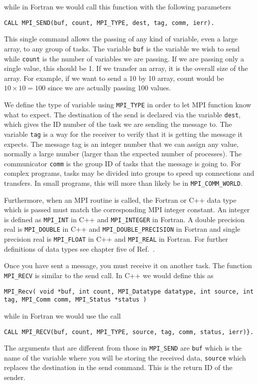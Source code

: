 while in Fortran we would call this function with the following parameters
\begin{lstlisting}
CALL MPI_SEND(buf, count, MPI_TYPE, dest, tag, comm, ierr).
\end{lstlisting}
This single command allows the passing of any kind of variable, even a large array, to any group of tasks. 
The variable \lstinline{buf} is the variable we wish to send while \lstinline{count} 
is the  number of variables we are passing. If we are passing only a single value, this should be 1. 
If we transfer an array, it is  the overall size of the array. 
For example, if we want to send a 10 by 10 array, count would be $10\times 10=100$ 
since we are  actually passing 100 values.  

We define the type of variable using \lstinline{MPI_TYPE}
in order to let  MPI function know  what to expect.  The destination of the send is declared via the variable 
\lstinline{dest}, which gives the  ID number of the task we are  sending the message to.
The variable \lstinline{tag} 
is a way for the receiver to verify that it is  getting the message it expects. 
The message tag is an integer number that we can assign any value, normally a large number (larger than the expected number of processes).
The communicator \lstinline{comm} is the group ID of tasks that the message is going to. 
For complex programs,  tasks may be divided into groups to speed up connections and transfers. 
In small programs, this will more than likely be in \lstinline{MPI_COMM_WORLD}.

Furthermore, when an MPI routine is called, the Fortran or C++ data type which is passed must match the corresponding 
MPI integer constant. An integer is defined as \lstinline{MPI_INT} in C++ and 
\lstinline{MPI_INTEGER}  in Fortran.  
A double precision real is
\lstinline{MPI_DOUBLE} in C++ and 
\lstinline{MPI_DOUBLE_PRECISION} in Fortran and single precision real is 
\lstinline{MPI_FLOAT} in C++ and 
\lstinline{MPI_REAL}  in  Fortran.  For further definitions of data types see chapter five of
Ref.~\cite{mpiref}.

Once you have  sent a message, you must receive it on another task. The function \lstinline{MPI_RECV} is similar to the send call.
In C++ we would define this as 
\begin{lstlisting}
MPI_Recv( void *buf, int count, MPI_Datatype datatype, int source, int tag, MPI_Comm comm, MPI_Status *status )
\end{lstlisting}
while in Fortran we would use the call 
\begin{lstlisting}
CALL MPI_RECV(buf, count, MPI_TYPE, source, tag, comm, status, ierr)}.
\end{lstlisting}
The arguments that are different from those in \lstinline{MPI_SEND} are
\lstinline{buf} which  is the name of the variable where you will  be storing the received data, 
\lstinline{source} which  replaces the destination in the send command. This is the return ID of the sender.

